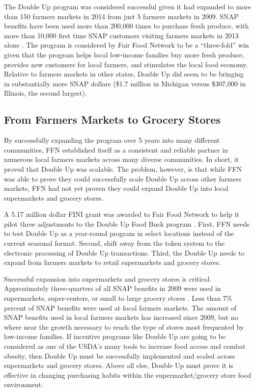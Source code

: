 \documentclass[12pt,letterpaperpaper,]{book}
\begin{document}
The Double Up program was considered successful given it had expanded to
more than 150 farmers markets in 2014 from just 5 farmers markets in
2009. SNAP benefits have been used more than 200,000 times to purchase
fresh produce, with more than 10,000 first time SNAP customers visiting
farmers markets in 2013 alone \citep{fair_food_network_double_2014}. The
program is considered by Fair Food Network to be a ``three-fold'' win
given that the program helps local low-income families buy more fresh
produce, provides new customers for local farmers, and stimulates the
local food economy. Relative to farmers markets in other states, Double
Up did seem to be bringing in substantially more SNAP dollars (\$1.7
million in Michigan versus \$307,000 in Illinois, the second largest).

\subsection*{From Farmers Markets to Grocery
Stores}\label{from-farmers-markets-to-grocery-stores}

By successfully expanding the program over 5 years into many different
communities, FFN established itself as a consistent and reliable partner
in numerous local farmers markets across many diverse communities. In
short, it proved that Double Up was scalable. The problem, however, is
that while FFN was able to prove they could successfully scale Double Up
across other farmers markets, FFN had not yet proven they could expand
Double Up into local supermarkets and grocery stores.

A 5.17 million dollar FINI grant was awarded to Fair Food Network to
help it pilot three adjustments to the Double Up Food Buck program
\citep{usda_nifa_usda_2015}. First, FFN needs to test Double Up as a
year-round program in select locations instead of the current seasonal
format. Second, shift away from the token system to the electronic
processing of Double Up transactions. Third, the Double Up needs to
expand from farmers markets to retail supermarkets and grocery stores.

Successful expansion into supermarkets and grocery stores is critical.
Approximately three-quarters of all SNAP benefits in 2009 were used in
supermarkets, super-centers, or small to large grocery stores
\citep{castner_benefit_2011}. Less than 7\% percent of SNAP benefits
were used at local farmers markets. The amount of SNAP benefits used in
local farmers markets has increased since 2009, but no where near the
growth necessary to reach the type of stores most frequented by
low-income families. If incentive programs like Double Up are going to
be considered as one of the USDA's many tools to increase food access
and combat obesity, then Double Up must be successfully implemented and
scaled across supermarkets and grocery stores. Above all else, Double Up
must prove it is effective in changing purchasing habits within the
supermarket/grocery store food environment.
\end{document}
